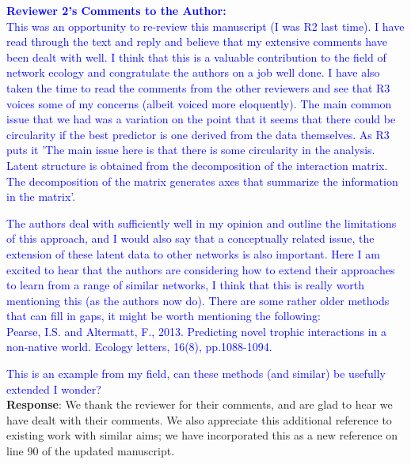 \documentclass{article}
\begin{document}
\textcolor{blue}{\textbf{Reviewer 2's Comments to the Author:}} \\

\textcolor{blue}{This was an opportunity to re-review this manuscript (I was R2 last time). I have read through the text and reply and believe that my extensive comments have been dealt with well. I think that this is a valuable contribution to the field of network ecology and congratulate the authors on a job well done. I have also taken the time to read the comments from the other reviewers and see that R3 voices some of my concerns (albeit voiced more eloquently). The main common issue that we had was a variation on the point that it seems that there could be circularity if the best predictor is one derived from the data themselves. As R3 puts it 'The main issue here is that there is some circularity in the analysis. Latent structure is obtained from the decomposition of the interaction matrix. The decomposition of the matrix generates axes that summarize the information in the matrix'.}

\textcolor{blue}{The authors deal with sufficiently well in my opinion and outline the limitations of this approach, and I would also say that a conceptually related issue, the extension of these latent data to other networks is also important. Here I am excited to hear that the authors are considering how to extend their approaches to learn from a range of similar networks, I think that this is really worth mentioning this (as the authors now do). There are some rather older methods that can fill in gaps, it might be worth mentioning the following:}\\

\textcolor{blue}{Pearse, I.S. and Altermatt, F., 2013. Predicting novel trophic interactions in a non‐native world. Ecology letters, 16(8), pp.1088-1094.} 

\textcolor{blue}{This is an example from my field, can these methods (and similar) be usefully extended I wonder?}
\\
\textbf{Response}: We thank the reviewer for their comments, and are glad to hear we have dealt with their comments. We also appreciate this additional reference to existing work with similar aims; we have incorporated this as a new reference on line 90 of the updated manuscript. 
\\







\end{document}
